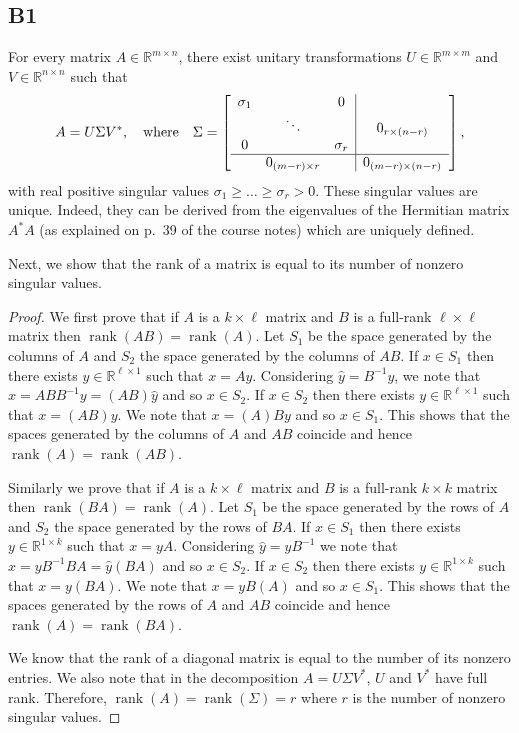 \documentclass[11pt]{article}
\DeclareMathOperator{\rank}{rank}
\newcommand{\real}{\mathbb{R}} %
\newcommand{\snorm}[1]{\norm{#1}_2} %
\begin{document}
\subsection*{B1}
For every matrix \(A \in \real^{m \times n}\), there exist unitary transformations \(U \in \real^{m \times m}\) and \(V \in \real^{n \times n}\) such that
\[
A = U \Sigma V^*, \quad \textnormal{where}\quad \Sigma = \left[\begin{array}{ccc|c}
\sigma_1 & & 0 & \\
& \ddots & & 0_{r \times (n-r)}\\
0 && \sigma_r & \\
\hline
& 0_{(m-r) \times r} & & 0_{(m-r) \times (n-r)}
\end{array}\right],
\]
with real positive singular values \(\sigma_1 \geqslant \dots \geqslant \sigma_r > 0\).
These singular values are unique. Indeed, they can be derived from the eigenvalues of the Hermitian matrix $A^*A$ (as explained on p.~39 of the course notes) which are uniquely defined.

Next, we show that the rank of a matrix is equal to its number of nonzero singular values.
\begin{proof}
	We first prove that if $A$ is a $k\times \ell$ matrix and $B$ is a full-rank $\ell \times \ell$ matrix then $\rank(AB)=\rank(A)$.
	Let $S_1$ be the space generated by the columns of $A$ and $S_2$ the space generated by the columns of $AB$.
	If $x\in S_1$ then there exists $y\in \real^{\ell \times 1}$ such that $x=Ay$.
	Considering $\hat{y}=B^{-1}y$, we note that $x=ABB^{-1}y=(AB)\hat{y}$ and so $x\in S_2$. If $x\in S_2$ then there exists $y\in \real^{\ell\times 1}$ such that $x=(AB)y$.
	We note that $x=(A)By$ and so $x\in S_1$. This shows that the spaces generated by the columns of $A$ and $AB$ coincide and hence $\rank(A)=\rank(AB)$.
	
	Similarly we prove that if $A$ is a $k \times \ell$ matrix and $B$ is a full-rank $k\times k$ matrix then $\rank(BA)=\rank(A)$.
	Let $S_1$ be the space generated by the rows of $A$ and $S_2$ the space generated by the rows of $BA$.
	If $x\in S_1$ then there exists $y\in \real^{1\times k}$ such that $x=yA$. Considering $\hat{y}=yB^{-1}$ we note that $x=yB^{-1}BA=\hat{y}(BA)$ and so $x\in S_2$. If $x\in S_2$ then there exists $y\in \real^{1\times k}$ such that $x=y(BA)$.
	We note that $x=yB(A)$ and so $x\in S_1$. This shows that the spaces generated by the rows of $A$ and $AB$ coincide and hence $\rank(A)=\rank(BA)$.
	
	We know that the rank of a diagonal matrix is equal to the number of its nonzero entries.
	We also note that in the decomposition \(A = U \Sigma V^*\), \(U\) and \(V^*\) have full rank.
	Therefore, \(\rank(A) = \rank(\Sigma) = r\) where $r$ is the number of nonzero singular values.
\end{proof}
\end{document}
